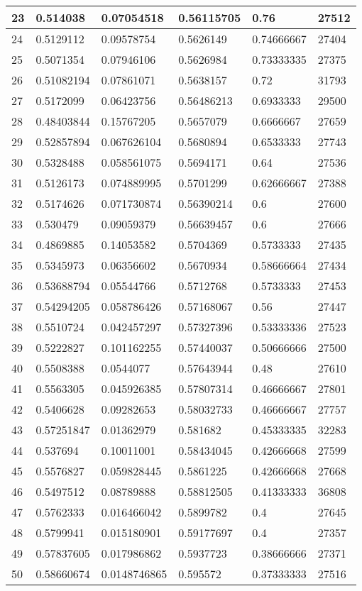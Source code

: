 \begin{longtable}{|l|l|l|l|l|l|}
23 & 0.514038 & 0.07054518 & 0.56115705 & 0.76 & 27512 \\ \hline 
24 & 0.5129112 & 0.09578754 & 0.5626149 & 0.74666667 & 27404 \\ \hline 
25 & 0.5071354 & 0.07946106 & 0.5626984 & 0.73333335 & 27375 \\ \hline 
26 & 0.51082194 & 0.07861071 & 0.5638157 & 0.72 & 31793 \\ \hline 
27 & 0.5172099 & 0.06423756 & 0.56486213 & 0.6933333 & 29500 \\ \hline 
28 & 0.48403844 & 0.15767205 & 0.5657079 & 0.6666667 & 27659 \\ \hline 
29 & 0.52857894 & 0.067626104 & 0.5680894 & 0.6533333 & 27743 \\ \hline 
30 & 0.5328488 & 0.058561075 & 0.5694171 & 0.64 & 27536 \\ \hline 
31 & 0.5126173 & 0.074889995 & 0.5701299 & 0.62666667 & 27388 \\ \hline 
32 & 0.5174626 & 0.071730874 & 0.56390214 & 0.6 & 27600 \\ \hline 
33 & 0.530479 & 0.09059379 & 0.56639457 & 0.6 & 27666 \\ \hline 
34 & 0.4869885 & 0.14053582 & 0.5704369 & 0.5733333 & 27435 \\ \hline 
35 & 0.5345973 & 0.06356602 & 0.5670934 & 0.58666664 & 27434 \\ \hline 
36 & 0.53688794 & 0.05544766 & 0.5712768 & 0.5733333 & 27453 \\ \hline 
37 & 0.54294205 & 0.058786426 & 0.57168067 & 0.56 & 27447 \\ \hline 
38 & 0.5510724 & 0.042457297 & 0.57327396 & 0.53333336 & 27523 \\ \hline 
39 & 0.5222827 & 0.101162255 & 0.57440037 & 0.50666666 & 27500 \\ \hline 
40 & 0.5508388 & 0.0544077 & 0.57643944 & 0.48 & 27610 \\ \hline 
41 & 0.5563305 & 0.045926385 & 0.57807314 & 0.46666667 & 27801 \\ \hline 
42 & 0.5406628 & 0.09282653 & 0.58032733 & 0.46666667 & 27757 \\ \hline 
43 & 0.57251847 & 0.01362979 & 0.581682 & 0.45333335 & 32283 \\ \hline 
44 & 0.537694 & 0.10011001 & 0.58434045 & 0.42666668 & 27599 \\ \hline 
45 & 0.5576827 & 0.059828445 & 0.5861225 & 0.42666668 & 27668 \\ \hline 
46 & 0.5497512 & 0.08789888 & 0.58812505 & 0.41333333 & 36808 \\ \hline 
47 & 0.5762333 & 0.016466042 & 0.5899782 & 0.4 & 27645 \\ \hline 
48 & 0.5799941 & 0.015180901 & 0.59177697 & 0.4 & 27357 \\ \hline 
49 & 0.57837605 & 0.017986862 & 0.5937723 & 0.38666666 & 27371 \\ \hline 
50 & 0.58660674 & 0.0148746865 & 0.595572 & 0.37333333 & 27516 \\ \hline 
\end{longtable}
